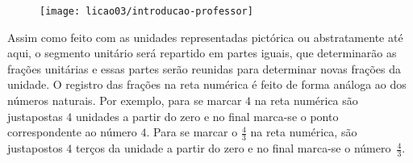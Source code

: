 \begin{minipage}{\textwidth}
\begin{multicols}{2}

 

\null\vfill
\begin{figure}[H]
\centering

\texttt{[image: licao03/introducao-professor]}
\end{figure}
\vfill\null

\columnbreak

\null\vfill
\begin{center}


\end{center}

\vfill\null
\end{multicols}
\end{minipage}

Assim como feito com as unidades representadas pictórica ou abstratamente até aqui, o segmento unitário será repartido em partes iguais, que determinarão as frações unitárias e essas partes serão  reunidas para determinar novas frações da unidade. O registro das frações na reta numérica é feito de forma análoga ao dos números naturais. Por exemplo, para se marcar $4$ na reta numérica são justapostas $4$ unidades a partir do zero e no final marca-se o ponto correspondente ao número $4$. Para se marcar o $\frac{4}{3}$ na reta numérica, são justapostos $4$ terços da unidade a partir do zero e no final marca-se o número~$\frac{4}{3}$.

